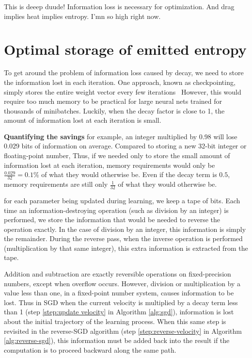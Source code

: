 \documentclass{article}
\begin{document}
This is deeep duude! Information loss is necessary for optimization. And drag
implies heat implies entropy. I'mn so high right now.

\section{Optimal storage of emitted entropy}
\label{sec:reversible computation}
To get around the problem of information loss caused by decay, we need to store the information lost in each iteration.
One approach, known as checkpointing, simply stores the entire weight vector every few iterations~\citep{martens2012training}
However, this would require too much memory to be practical for large neural nets trained for thousands of minibatches.
Luckily, when the decay factor is close to 1, the amount of information lost at each iteration is small.

\textbf{Quantifying the savings}
for example, an integer multiplied by 0.98 will lose $0.029$ bits of information on average.
Compared to storing a new 32-bit integer or floating-point number, 
Thus, if we needed only to store the small amount of information lost at each iteration, memory requirements would only be ${\frac{0.029}{32} = 0.1\%}$ of what they would otherwise be.
Even if the decay term is $0.5$, memory requirements are still only $\frac{1}{32}$ of what they would otherwise be.

for each parameter being updated during learning, we keep a tape of bits.
Each time an information-destroying operation (such as division by an integer) is performed, we store the information that would be needed to reverse the operation exactly.  In the case of division by an integer, this information is simply the remainder.
During the reverse pass, when the inverse operation is performed (multiplication by that same integer), this extra information is extracted from the tape.

Addition and subtraction are exactly reversible operations on fixed-precision numbers, except when overflow occurs.
However, division or multiplication by a value less than one, in a fixed-point number system, causes information to be lost.
Thus in SGD when the current velocity is multiplied by a decay term less than 1 (step \ref{step:update velocity} in Algorithm \ref{alg:sgd}), information is lost about the initial trajectory of the learning process.
When this same step is revisited in the reverse-SGD algorithm (step \ref{step:reverse-velocity} in Algorithm \ref{alg:reverse-sgd}), this information must be added back into the result if the computation is to proceed backward along the same path.
\end{document}
